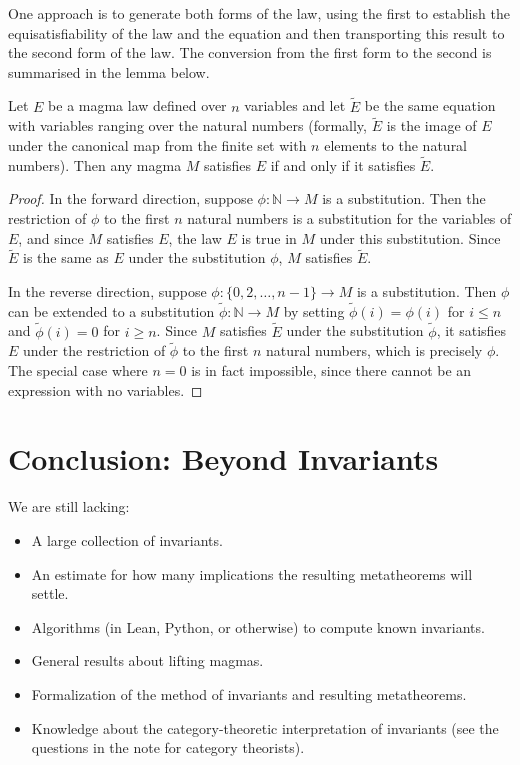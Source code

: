 One approach is to generate both forms of the law, using the first to establish the equisatisfiability of the law and the equation and then transporting this result to the second form of the law. The conversion from the first form to the second is summarised in the lemma below.

\begin{lemma}\label{compatibility-between-magma-laws}
	Let $E$ be a magma law defined over $n$ variables and let $\tilde{E}$ be the same equation with variables ranging over the natural numbers (formally, $\tilde{E}$ is the image of $E$ under the canonical map from the finite set with $n$ elements to the natural numbers). Then any magma $M$ satisfies $E$ if and only if it satisfies $\tilde{E}$.
\end{lemma}

\begin{proof}
	In the forward direction, suppose $\phi : \mathbb{N} \to M$ is a substitution. Then the restriction of $\phi$ to the first $n$ natural numbers is a substitution for the variables of $E$, and since $M$ satisfies $E$, the law $E$ is true in $M$ under this substitution. Since $\tilde{E}$ is the same as $E$ under the substitution $\phi$, $M$ satisfies $\tilde{E}$.

	In the reverse direction, suppose $\phi : \{0, 2, \ldots, n-1\} \to M$ is a substitution. Then $\phi$ can be extended to a substitution $\tilde{\phi} : \mathbb{N} \to M$ by setting $\tilde{\phi}(i) = \phi(i)$ for $i \leq n$ and $\tilde{\phi}(i) = 0$ for $i \geq n$. Since $M$ satisfies $\tilde{E}$ under the substitution $\tilde{\phi}$, it satisfies $E$ under the restriction of $\tilde{\phi}$ to the first $n$ natural numbers, which is precisely $\phi$. The special case where $n = 0$ is in fact impossible, since there cannot be an expression with no variables.
\end{proof}

\section{Conclusion: Beyond Invariants}
We are still lacking:
\begin{itemize}
	\item A large collection of invariants.
	\item An estimate for how many implications the resulting metatheorems will settle.
	\item Algorithms (in Lean, Python, or otherwise) to compute known invariants.
	\item General results about lifting magmas.
	\item Formalization of the method of invariants and resulting metatheorems.
	\item Knowledge about the category-theoretic interpretation of invariants (see the questions in the note for category theorists).
\end{itemize}

